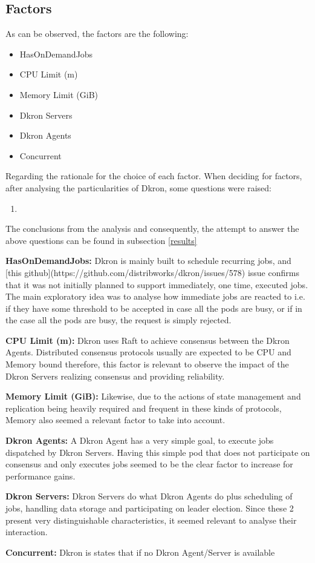 \documentclass[runningheads]{llncs}
\begin{document}
\subsection{Factors}
As can be observed, the factors are the following:
\begin{itemize}
    \item HasOnDemandJobs
    \item CPU Limit (m)
    \item Memory Limit (GiB)
    \item Dkron Servers
    \item Dkron Agents
    \item Concurrent
\end{itemize}

Regarding the rationale for the choice of each factor. When deciding for factors,
after analysing the particularities of Dkron, some questions were raised:
\begin{enumerate}
    \item
\end{enumerate}

The conclusions from the analysis and consequently, the attempt to answer the above questions
can be found in subsection \ref{results}

\par \textbf{HasOnDemandJobs:} Dkron is mainly built to schedule recurring jobs,
and [this github](https://github.com/distribworks/dkron/issues/578) issue confirms that it was not initially planned to support immediately,
one time, executed jobs. The main exploratory idea was to analyse how immediate jobs are reacted to
i.e. if they have some threshold to be accepted in case all the pods are busy, or if in the case
all the pods are busy, the request is simply rejected.
\par \textbf{CPU Limit (m):} Dkron uses Raft to achieve consensus between the Dkron Agents.
Distributed consensus protocols usually are expected to be CPU and Memory bound therefore,
this factor is relevant to observe the impact of the Dkron Servers realizing consensus and
providing reliability.
\par \textbf{Memory Limit (GiB):} Likewise, due to the actions of state management and replication
being heavily required and frequent in these kinds of protocols, Memory also seemed a relevant
factor to take into account.
\par \textbf{Dkron Agents:} A Dkron Agent has a very simple goal, to execute jobs dispatched by
Dkron Servers. Having this simple pod that does not participate on consensus and only executes jobs
seemed to be the clear factor to increase for performance gains.
\par \textbf{Dkron Servers:} Dkron Servers do what Dkron Agents do plus scheduling of jobs,
handling data storage and participating on leader election. Since these 2 present very
distinguishable characteristics, it seemed relevant to analyse their interaction.
\par \textbf{Concurrent:} Dkron is states that if no Dkron Agent/Server is available
\end{document}
